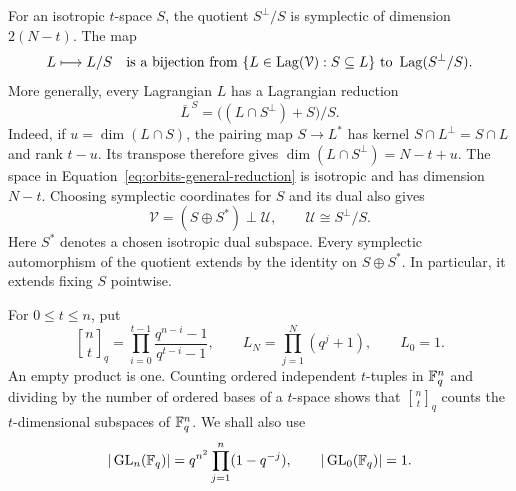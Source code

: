 For an isotropic $t$-space $S$, the quotient
$S^\perp/S$ is symplectic of dimension $2(N-t)$.  The map
\begin{equation}
 L\longmapsto L/S
 \quad\text{is a bijection from }
 \{L\in\operatorname{Lag}(\mathcal V):S\subseteq L\}
 \text{ to }\operatorname{Lag}(S^\perp/S).
 \label{eq:orbits-containing-reduction}
\end{equation}
More generally, every Lagrangian $L$ has a Lagrangian reduction
\begin{equation}
 \overline L^{\,S}=\big((L\cap S^\perp)+S\big)/S.
 \label{eq:orbits-general-reduction}
\end{equation}
Indeed, if $u=\dim(L\cap S)$, the pairing map $S\to L^*$ has kernel
$S\cap L^\perp=S\cap L$ and rank $t-u$.  Its transpose therefore gives
$\dim(L\cap S^\perp)=N-t+u$.  The space in
Equation~\eqref{eq:orbits-general-reduction} is isotropic and has dimension
$N-t$.  Choosing symplectic coordinates for $S$ and its dual also gives
\begin{equation}
 \mathcal V=(S\oplus S^*)\mathbin{\perp}\mathcal U,
 \qquad \mathcal U\cong S^\perp/S.
 \label{eq:orbits-quotient-extension}
\end{equation}
Here $S^*$ denotes a chosen isotropic dual subspace.  Every symplectic
automorphism of the quotient extends by the identity on $S\oplus S^*$.
In particular, it extends fixing $S$ pointwise.

For $0\le t\le n$, put
\begin{equation}
 \genfrac{[}{]}{0pt}{}{n}{t}_q
 =\prod_{i=0}^{t-1}\frac{q^{n-i}-1}{q^{t-i}-1},
 \qquad
 L_N=\prod_{j=1}^N(q^j+1),\qquad L_0=1.
 \label{eq:orbits-basic-notation}
\end{equation}
An empty product is one.  Counting ordered independent $t$-tuples
in $\mathbb F_q^n$ and dividing by the number of ordered bases of a
$t$-space shows that $\genfrac{[}{]}{0pt}{}{n}{t}_q$ counts the
$t$-dimensional subspaces of $\mathbb F_q^n$.  We shall also use
\begin{equation}
 |\operatorname{GL}_n(\mathbb F_q)|
 =q^{n^2}\prod_{j=1}^n(1-q^{-j}),
 \qquad |\operatorname{GL}_0(\mathbb F_q)|=1.
 \label{eq:orbits-gl-order}
\end{equation}

